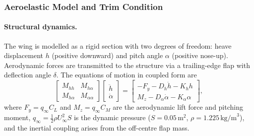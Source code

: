 \documentclass[11pt,a4paper]{article}
\begin{document}
\subsubsection{Aeroelastic Model and Trim Condition}
\label{sec:model}

\paragraph{Structural dynamics.}
The wing is modelled as a rigid section with two degrees of freedom: heave
displacement $h$ (positive downward) and pitch angle $\alpha$ (positive
nose-up).
Aerodynamic forces are transmitted to the structure via a trailing-edge flap
with deflection angle $\delta$.
The equations of motion in coupled form are
\begin{equation}
  \begin{bmatrix} M_{hh} & M_{h\alpha} \\ M_{h\alpha} & M_{\alpha\alpha} \end{bmatrix}
  \begin{bmatrix} \ddot{h} \\ \ddot{\alpha} \end{bmatrix}
  =
  \begin{bmatrix} -F_y - D_h\dot{h} - K_h h \\ M_z - D_\alpha\dot{\alpha} - K_\alpha\alpha \end{bmatrix},
  \label{eq:eom}
\end{equation}
where $F_y = q_\infty C_L$ and $M_z = q_\infty C_M$ are the aerodynamic lift
force and pitching moment, $q_\infty = \tfrac{1}{2}\rho U_\infty^2 S$ is the
dynamic pressure ($S = 0.05\,\text{m}^2$, $\rho = 1.225\,\text{kg/m}^3$), and
the inertial coupling arises from the off-centre flap mass.
\end{document}

